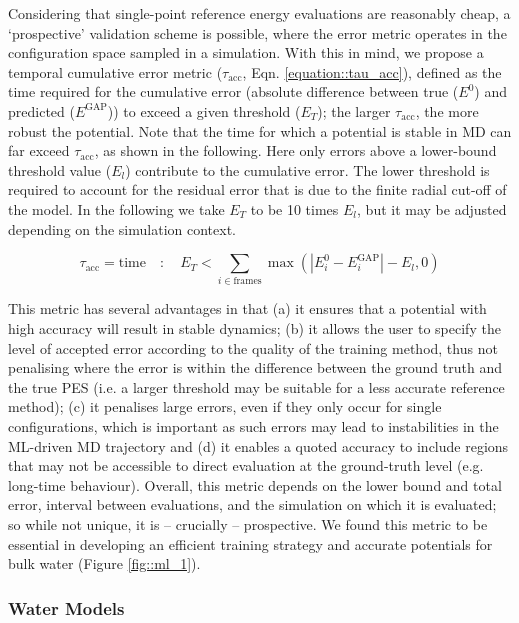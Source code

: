 \documentclass[../../main.tex]{subfiles}
\begin{document}
Considering that single-point reference energy evaluations are reasonably cheap, a ‘prospective’ validation scheme is possible, where the error metric operates in the configuration space sampled in a simulation. With this in mind, we propose a temporal cumulative error metric ($\tau_\text{acc}$, Eqn. \eqref{equation::tau_acc}), defined as the time required for the cumulative error (absolute difference between true ($E^0$) and predicted ($E^\text{GAP}$)) to exceed a given threshold ($E_T$); the larger $\tau_\text{acc}$, the more robust the potential. Note that the time for which a potential is stable in MD can far exceed $\tau_\text{acc}$, as shown in the following. Here only errors above a lower-bound threshold value ($E_l$) contribute to the cumulative error. The lower threshold is required to account for the residual error that is due to the finite radial cut-off of the model. In the following we take $E_T$ to be 10 times $E_l$, but it may be adjusted depending on the simulation context.


\begin{equation}
	\tau_\text{acc} = \text{time} \quad: \quad E_T < \sum_{i \in \text{frames}} \max(|E_i^0 - E_i^\text{GAP}| - E_l, 0)
	\label{equation::tau_acc}
\end{equation} 


This metric has several advantages in that (a) it ensures that a potential with high accuracy will result in stable dynamics; (b) it allows the user to specify the level of accepted error according to the quality of the training method, thus not penalising where the error is within the difference between the ground truth and the true PES (i.e. a larger threshold may be suitable for a less accurate reference method); (c) it penalises large errors, even if they only occur for single configurations, which is important as such errors may lead to instabilities in the ML-driven MD trajectory and (d) it enables a quoted accuracy to include regions that may not be accessible to direct evaluation at the ground-truth level (e.g. long-time behaviour). Overall, this metric depends on the lower bound and total error, interval between evaluations, and the simulation on which it is evaluated; so while not unique, it is – crucially – prospective. We found this metric to be essential in developing an efficient training strategy and accurate potentials for bulk water (Figure \ref{fig::ml_1}).



\subsubsection{Water Models}
\end{document}
